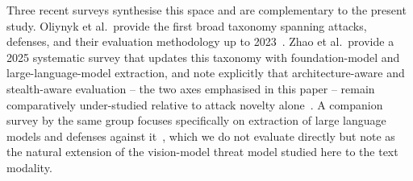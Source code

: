 \documentclass[journal,10pt]{IEEEtran}
\begin{document}
Three recent surveys synthesise this space and are complementary to the present study. Oliynyk et
al.\ provide the first broad taxonomy spanning attacks, defenses, and their evaluation
methodology up to 2023~\cite{oliynyk2023survey}. Zhao et al.\ provide a 2025 systematic survey
that updates this taxonomy with foundation-model and large-language-model extraction, and note
explicitly that architecture-aware and stealth-aware evaluation -- the two axes emphasised in this
paper -- remain comparatively under-studied relative to attack novelty
alone~\cite{zhao2025systematic}. A companion survey by the same group focuses specifically on
extraction of large language models and defenses against
it~\cite{zhao2025llmsurvey}, which we do not evaluate directly but note as the natural extension
of the vision-model threat model studied here to the text modality.
\end{document}
